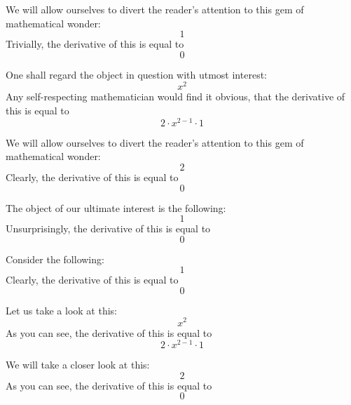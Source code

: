 \documentclass{article}
\begin{document}
We will allow ourselves to divert the reader's attention to this gem of mathematical wonder:
\begin{equation}
1 
\end{equation}
Trivially, the derivative of this is equal to
\begin{equation}
0 
\end{equation}

One shall regard the object in question with utmost interest:
\begin{equation}
x ^{2 } 
\end{equation}
Any self-respecting mathematician would find it obvious, that the derivative of this is equal to
\begin{equation}
2 \cdot x ^{2 - 1 } \cdot 1 
\end{equation}

We will allow ourselves to divert the reader's attention to this gem of mathematical wonder:
\begin{equation}
2 
\end{equation}
Clearly, the derivative of this is equal to
\begin{equation}
0 
\end{equation}

The object of our ultimate interest is the following:
\begin{equation}
1 
\end{equation}
Unsurprisingly, the derivative of this is equal to
\begin{equation}
0 
\end{equation}

Consider the following:
\begin{equation}
1 
\end{equation}
Clearly, the derivative of this is equal to
\begin{equation}
0 
\end{equation}

Let us take a look at this:
\begin{equation}
x ^{2 } 
\end{equation}
As you can see, the derivative of this is equal to
\begin{equation}
2 \cdot x ^{2 - 1 } \cdot 1 
\end{equation}

We will take a closer look at this:
\begin{equation}
2 
\end{equation}
As you can see, the derivative of this is equal to
\begin{equation}
0 
\end{equation}
\end{document}
